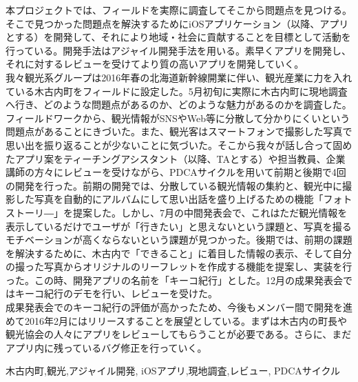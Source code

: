 \begin{jabstract}
\quad 本プロジェクトでは、フィールドを実際に調査してそこから問題点を見つける。そこで見つかった問題点を解決するためにiOSアプリケーション（以降、アプリとする）を開発して、それにより地域・社会に貢献することを目標として活動を行っている。開発手法はアジャイル開発手法を用いる。素早くアプリを開発し、それに対するレビューを受けてより質の高いアプリを開発していく。\\
\quad 我々観光系グループは2016年春の北海道新幹線開業に伴い、観光産業に力を入れている木古内町をフィールドに設定した。5月初旬に実際に木古内町に現地調査へ行き、どのような問題点があるのか、どのような魅力があるのかを調査した。フィールドワークから、観光情報がSNSやWeb等に分散して分かりにくいという問題点があることにきづいた。また、観光客はスマートフォンで撮影した写真で思い出を振り返ることが少ないことに気づいた。そこから我々が話し合って固めたアプリ案をティーチングアシスタント（以降、TAとする）や担当教員、企業講師の方々にレビューを受けながら、PDCAサイクルを用いて前期と後期で4回の開発を行った。前期の開発では、分散している観光情報の集約と、観光中に撮影した写真を自動的にアルバムにして思い出話を盛り上げるための機能「フォトストーリ―」を提案した。しかし、7月の中間発表会で、これはただ観光情報を表示しているだけでユーザが「行きたい」と思えないという課題と、写真を撮るモチベーションが高くならないという課題が見つかった。後期では、前期の課題を解決するために、木古内で「できること」に着目した情報の表示、そして自分の撮った写真からオリジナルのリーフレットを作成する機能を提案し、実装を行った。この時、開発アプリの名前を「キーコ紀行」とした。12月の成果発表会ではキーコ紀行のデモを行い、レビューを受けた。\\
\quad 成果発表会でのキーコ紀行の評価が高かったため、今後もメンバー間で開発を進めて2016年2月にはリリースすることを展望としている。まずは木古内の町長や観光協会の人々にアプリをレビューしてもらうことが必要である。さらに、まだアプリ内に残っているバグ修正を行っていく。\\

\begin{jkeyword}
木古内町,観光,アジャイル開発, iOSアプリ,現地調査,レビュー, PDCAサイクル
\end{jkeyword}
\end{jabstract}

